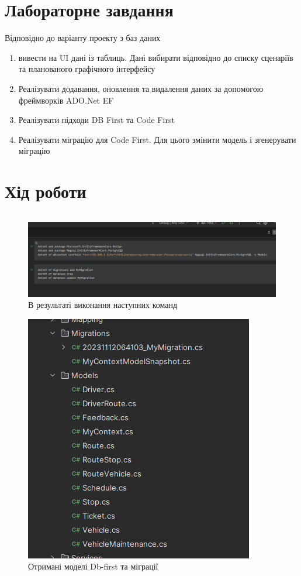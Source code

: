 \documentclass[14pt]{extreport}
\begin{document}
\begin{normalsize}
	\section*{Лабораторне завдання}
	Відповідно до варіанту проекту з баз даних 
	\begin{enumerate}
		\item вивести на UI дані із таблиць. Дані вибирати відповідно до списку сценаріїв та планованого графічного інтерфейсу  
		\item Реалізувати додавання, оновлення та видалення даних за допомогою фреймворків ADO.Net EF 
		\item Реалізувати підходи DB First та Code First
		\item Реалізувати міграцію для Code First. Для цього змінити модель і згенерувати міграцію 
	\end{enumerate}
	
	
	\section*{Хід роботи}
	
	\begin{small}
		\begin{lstlisting}
		\end{lstlisting}
	\end{small}
	
	\begin{figure}[H]
		\centering
		\includegraphics[scale=0.63]{1}
		\caption{В результаті виконання наступних команд}
	\end{figure}
	
	
	\begin{figure}[H]
		\centering
		\includegraphics[scale=1]{2}
		\caption{Отримані моделі Db-first та міграції}
	\end{figure}
	

\end{normalsize}
\end{document}
